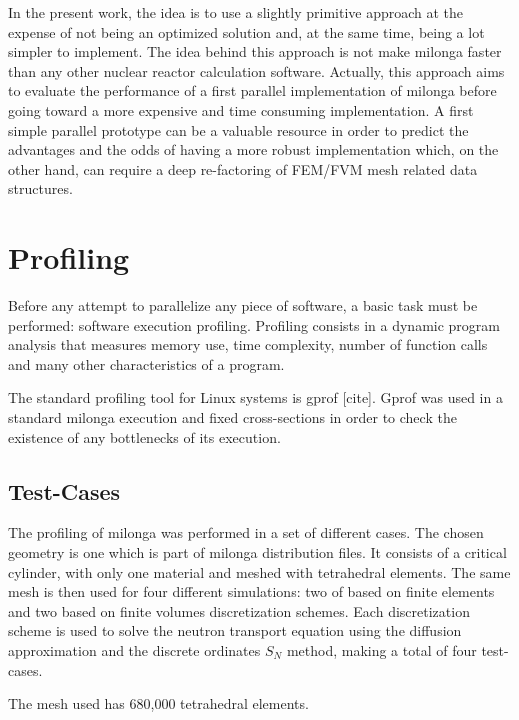 \documentclass{anstrans}
\begin{document}
In the present work, the idea is to use a slightly primitive approach at
the expense of not being an optimized solution and, at the same time,
being a lot simpler to implement. The idea behind this approach is not make
milonga faster than any other nuclear reactor calculation software.
Actually, this approach aims to evaluate the performance of a first
parallel implementation of milonga before going toward a more expensive
and time consuming implementation. A first simple parallel prototype can be
a valuable resource in order to predict the advantages and the odds of having
a more robust implementation which, on the other hand, can require a deep
re-factoring of FEM/FVM mesh related data structures.


\section{Profiling}
Before any attempt to parallelize any piece of software, a basic task must be performed:
software execution profiling. Profiling consists in a dynamic program analysis
that measures memory use, time complexity, number of function calls and many other characteristics of
a program.

The standard profiling tool for Linux systems is gprof [cite]. Gprof was used in a standard milonga
execution
and fixed cross-sections in order to check
the existence of any bottlenecks of its execution.

\subsection{Test-Cases}

The profiling of milonga was performed in a set of different cases. The chosen geometry is one which is part of
milonga distribution files. It consists of a critical cylinder, with only one material and meshed with
tetrahedral elements. The same mesh is then used for four different simulations: two of based on
finite elements and two based on finite volumes discretization schemes. Each discretization scheme is used
to solve the neutron transport equation using the diffusion approximation and the discrete ordinates $S_N$ method,
making a total of four test-cases.

The mesh used has 680,000 tetrahedral elements.
\end{document}
